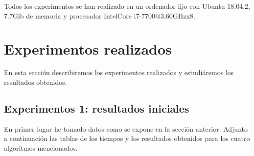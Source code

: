 \documentclass[11pt,a4paper]{article}
\begin{document}
	Todos los experimentos se han realizado en un ordenador fijo con Ubuntu 18.04.2, 7.7Gib de memoria y procesador IntelCore i7-7700@3.60GHzx8.
	
	\section{Experimentos realizados}
	
	En esta sección describiremos los experimentos realizados y estudiáremos los resultados obtenidos. 
	
	\subsection{Experimentos 1: resultados iniciales}
	
	En primer lugar he tomado datos como se expone en la sección anterior. Adjunto a continuación las tablas de los tiempos y los resultados obtenidos para los cuatro algoritmos mencionados.
	
\end{document}
